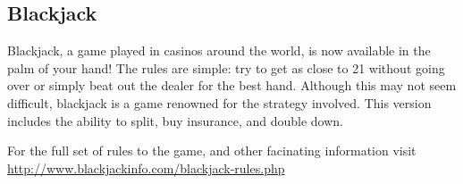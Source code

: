 \subsection{Blackjack}

Blackjack, a game played in casinos around the world, is now available
in the palm of your hand! The rules are simple: try to get as close to 21
without going over or simply beat out the dealer for the best hand.
Although this may not seem difficult, blackjack is a game renowned for the
strategy involved. This version includes the ability to split, buy insurance,
and double down. 

For the full set of rules to the game, and other facinating information
visit\\
\url{http://www.blackjackinfo.com/blackjack-rules.php}

